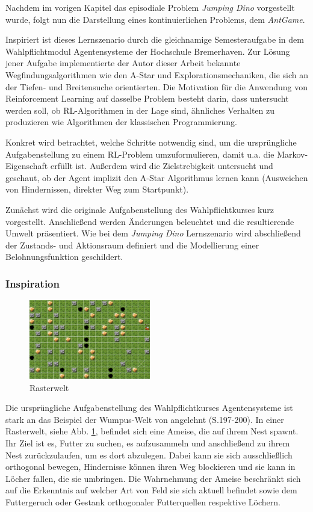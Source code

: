 Nachdem im vorigen Kapitel das episodiale Problem \textit{Jumping Dino} vorgestellt wurde, folgt nun die Darstellung eines kontinuierlichen Problems, dem \textit{AntGame}.
\par 
Inspiriert ist dieses Lernszenario durch die gleichnamige Semesteraufgabe in dem Wahlpflichtmodul \glqq Agentensysteme\grqq{} der Hochschule Bremerhaven. Zur Lösung jener Aufgabe implementierte der Autor dieser Arbeit bekannte Wegfindungsalgorithmen wie den A-Star und Explorationsmechaniken, die sich an der Tiefen- und Breitensuche orientierten. Die Motivation für die Anwendung von Reinforcement Learning auf dasselbe Problem besteht darin, dass untersucht werden soll, ob RL-Algorithmen in der Lage sind, ähnliches Verhalten zu produzieren wie Algorithmen der klassischen Programmierung.
\par 
Konkret wird betrachtet, welche Schritte notwendig sind, um die ursprüngliche Aufgabenstellung zu einem RL-Problem umzuformulieren, damit u.a. die Markov-Eigenschaft erfüllt ist. Außerdem wird die Zielstrebigkeit untersucht und geschaut, ob der Agent implizit den A-Star Algorithmus lernen kann (Ausweichen von Hindernissen, direkter Weg zum Startpunkt).
\par 
Zunächst wird die originale Aufgabenstellung des Wahlpflichtkurses kurz vorgestellt. Anschließend werden Änderungen beleuchtet und die resultierende Umwelt präsentiert. Wie bei dem \textit{Jumping Dino} Lernszenario wird abschließend der Zustands- und Aktionsraum definiert und die Modellierung einer Belohnungsfunktion geschildert.

\subsubsection{Inspiration}
\begin{figure}
    \begin{center}
    \includegraphics[width=200px]{images/rasterwelt.png}  \end{center}
    \caption{Rasterwelt}
    \label{fig:rasterwelt}
  \end{figure}
Die ursprüngliche Aufgabenstellung des Wahlpflichtkurses \glqq Agentensysteme\grqq{} ist stark an das Beispiel der \glqq Wumpus-Welt\grqq{} von \cite{wumpus} angelehnt (S.197-200). In einer Rasterwelt, siehe Abb. \ref{fig:rasterwelt}, befindet sich eine Ameise, die auf ihrem Nest spawnt. Ihr Ziel ist es, Futter zu suchen, es aufzusammeln und anschließend zu ihrem Nest zurückzulaufen, um es dort abzulegen. Dabei kann sie sich ausschließlich orthogonal bewegen, Hindernisse können ihren Weg blockieren und sie kann in Löcher fallen, die sie umbringen. Die Wahrnehmung der Ameise beschränkt sich auf die Erkenntnis auf welcher Art von Feld sie sich aktuell befindet sowie dem Futtergeruch oder Gestank orthogonaler Futterquellen respektive Löchern. 

